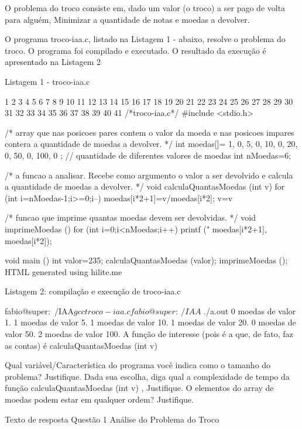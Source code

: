 O problema do troco consiste em, dado um valor (o troco) a ser pago de volta para alguém, Minimizar a quantidade de notas e moedas a devolver.

O programa troco-iaa.c, listado na Listagem 1 - abaixo, resolve o problema do troco. O programa foi compilado e executado. O resultado da execução é apresentado na Listagem 2

Listagem 1 - troco-iaa.c

 1
 2
 3
 4
 5
 6
 7
 8
 9
10
11
12
13
14
15
16
17
18
19
20
21
22
23
24
25
26
27
28
29
30
31
32
33
34
35
36
37
38
39
40
41
/*troco-iaa.c*/
#include <stdio.h>

/* array que nas posicoes pares contem o valor da 
   moeda e nas posicoes impares contera a quantidade 
   de moedas a devolver. */
int moedas[]={ 
     1, 0,
     5, 0,
    10, 0,
    20, 0,
    50, 0,
    100, 0
};
// quantidade de diferentes valores de moedas
int nMoedas=6;

/* a funcao a analisar.
   Recebe como argumento o valor a ser devolvido e
   calcula a quantidade de moedas a devolver. */
void calculaQuantasMoedas (int v) {
  for (int i=nMoedas-1;i>=0;i--) {
    moedas[i*2+1]=v/moedas[i*2];
    v=v%
  }
}

/* funcao que imprime quantas moedas devem 
   ser devolvidas. */
void imprimeMoedas () {
  for (int i=0;i<nMoedas;i++) {
    printf ("%
      moedas[i*2+1], moedas[i*2]);
  }
}

void main () {
  int valor=235;
  calculaQuantasMoedas (valor);
  imprimeMoedas ();
}
HTML generated using hilite.me



Listagem 2: compilação e execução de troco-iaa.c

fabio@super:~/IAA$ gcc troco-iaa.c 
fabio@super:~/IAA$ ./a.out
0 moedas de valor 1.
1 moedas de valor 5.
1 moedas de valor 10.
1 moedas de valor 20.
0 moedas de valor 50.
2 moedas de valor 100.
A função de interesse (pois é a que, de fato, faz as contas) é calculaQuantasMoedas (int v)

Qual variável/Característica do programa você indica como o tamanho do problema? Justifique.
Dada sua escolha, diga qual a complexidade de tempo da função calculaQuantasMoedas (int v) , Justifique.
O elementos do array de moedas podem estar em qualquer ordem? Justifique. 








Texto de resposta Questão 1
Análise do Problema do Troco


